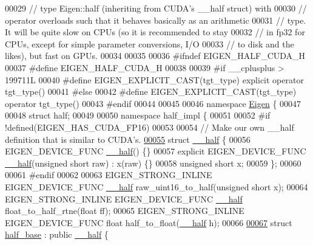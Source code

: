 \begin{DoxyCode}
00029 \textcolor{comment}{// type Eigen::half (inheriting from CUDA's \_\_half struct) with}
00030 \textcolor{comment}{// operator overloads such that it behaves basically as an arithmetic}
00031 \textcolor{comment}{// type. It will be quite slow on CPUs (so it is recommended to stay}
00032 \textcolor{comment}{// in fp32 for CPUs, except for simple parameter conversions, I/O}
00033 \textcolor{comment}{// to disk and the likes), but fast on GPUs.}
00034 
00035 
00036 \textcolor{preprocessor}{#ifndef EIGEN\_HALF\_CUDA\_H}
00037 \textcolor{preprocessor}{#define EIGEN\_HALF\_CUDA\_H}
00038 
00039 \textcolor{preprocessor}{#if \_\_cplusplus > 199711L}
00040 \textcolor{preprocessor}{#define EIGEN\_EXPLICIT\_CAST(tgt\_type) explicit operator tgt\_type()}
00041 \textcolor{preprocessor}{#else}
00042 \textcolor{preprocessor}{#define EIGEN\_EXPLICIT\_CAST(tgt\_type) operator tgt\_type()}
00043 \textcolor{preprocessor}{#endif}
00044 
00045 
00046 \textcolor{keyword}{namespace }\hyperlink{namespace_eigen}{Eigen} \{
00047 
00048 \textcolor{keyword}{struct }half;
00049 
00050 \textcolor{keyword}{namespace }half\_impl \{
00051 
00052 \textcolor{preprocessor}{#if !defined(EIGEN\_HAS\_CUDA\_FP16)}
00053 
00054 \textcolor{comment}{// Make our own \_\_half definition that is similar to CUDA's.}
\hyperlink{struct_eigen_1_1half__impl_1_1____half}{00055} \textcolor{keyword}{struct }\hyperlink{struct_eigen_1_1half__impl_1_1____half}{\_\_half} \{
00056   EIGEN\_DEVICE\_FUNC \hyperlink{struct_eigen_1_1half__impl_1_1____half}{\_\_half}() \{\}
00057   \textcolor{keyword}{explicit} EIGEN\_DEVICE\_FUNC \hyperlink{struct_eigen_1_1half__impl_1_1____half}{\_\_half}(\textcolor{keywordtype}{unsigned} \textcolor{keywordtype}{short} raw) : x(raw) \{\}
00058   \textcolor{keywordtype}{unsigned} \textcolor{keywordtype}{short} x;
00059 \};
00060 
00061 \textcolor{preprocessor}{#endif}
00062 
00063 EIGEN\_STRONG\_INLINE EIGEN\_DEVICE\_FUNC \hyperlink{struct_eigen_1_1half__impl_1_1____half}{\_\_half} raw\_uint16\_to\_half(\textcolor{keywordtype}{unsigned} \textcolor{keywordtype}{short} x);
00064 EIGEN\_STRONG\_INLINE EIGEN\_DEVICE\_FUNC \hyperlink{struct_eigen_1_1half__impl_1_1____half}{\_\_half} float\_to\_half\_rtne(\textcolor{keywordtype}{float} ff);
00065 EIGEN\_STRONG\_INLINE EIGEN\_DEVICE\_FUNC \textcolor{keywordtype}{float} half\_to\_float(\hyperlink{struct_eigen_1_1half__impl_1_1____half}{\_\_half} h);
00066 
\hyperlink{struct_eigen_1_1half__impl_1_1half__base}{00067} \textcolor{keyword}{struct }\hyperlink{struct_eigen_1_1half__impl_1_1half__base}{half\_base} : \textcolor{keyword}{public} \hyperlink{struct_eigen_1_1half__impl_1_1____half}{\_\_half} \{

\end{DoxyCode}
